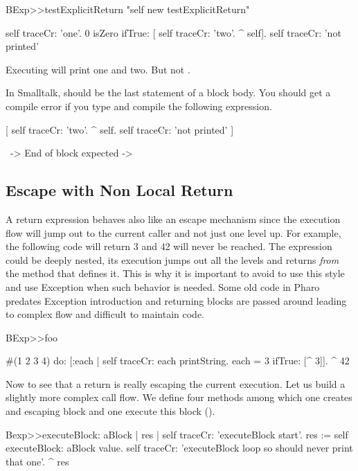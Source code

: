 \documentclass[a4paper,10pt,twoside]{book}
\begin{document}
\begin{code}{}
BExp>>testExplicitReturn
	"self new testExplicitReturn"
	
	self traceCr: 'one'.
	0 isZero ifTrue: [ self traceCr: 'two'. ^ self].
	self traceCr: 'not printed'
\end{code}

Executing  will print one and two. But not .

In Smalltalk, \ct{^} should be the last statement of a block body. You should get a compile error if you type and compile the following expression. 

\begin{code}{}
[ self traceCr: 'two'.
  ^ self.  
  self traceCr: 'not printed' ]
  
    ~-> End of block expected ->
\end{code}


\subsection{Escape with Non Local Return}
A return expression behaves also like an escape mechanism since the execution flow will jump out to the current caller and not just one level up. For example, the following code will return 3 and 42 will never be reached. The expression \ct{[ ^3 ]} could be deeply nested, its execution jumps out all the levels and returns \emph{from} the method that defines it. This is why it is important to avoid to use this style and use Exception when such behavior is needed. Some old code in Pharo predates Exception introduction and returning blocks are passed around leading to complex flow and difficult to maintain code. 

\begin{code}{}
BExp>>foo
	
	#(1 2 3 4) do: [:each | 
					self traceCr: each printString. 
					each = 3 
						ifTrue: [^ 3]].						
	^ 42
\end{code}

Now to see that a return is really escaping the current execution. Let us build a slightly more complex call flow. 
We define four methods among which one creates and escaping block  and one execute this block ().


\begin{code}{}
Bexp>>executeBlock: aBlock
	| res |
	self traceCr: 'executeBlock start'.
	res := self executeBlock: aBlock value. 
	self traceCr: 'executeBlock loop so should never print that one'.
	^  res
\end{code}
\end{document}
